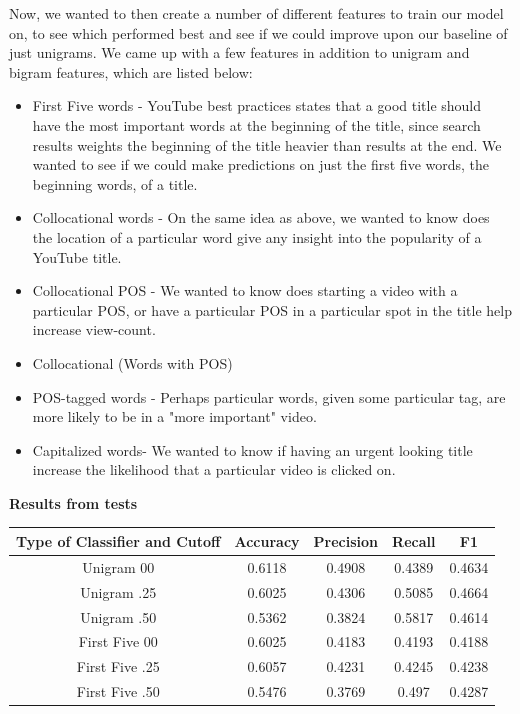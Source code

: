 \documentclass[a4paper,12pt]{article}
\begin{document}
Now, we wanted to then create a number of different features to train our model on, to see which performed best and see if we could improve upon our baseline of just unigrams. We came up with a few features in addition to unigram and bigram features, which are listed below: 
\begin{itemize}
    \item First Five words - YouTube best practices states that a good title should have the most important words at the beginning of the title, since search results weights the beginning of the title heavier than results at the end. We wanted to see if we could make predictions on just the first five words, the beginning words, of a title.
  \item Collocational words - On the same idea as above, we wanted to know does the location of a particular word give any insight into the popularity of a YouTube title.
  \item Collocational POS - We wanted to know does starting a video with a particular POS, or have a particular POS in a particular spot in the title help increase view-count.
  \item Collocational (Words with POS)
  \item POS-tagged words - Perhaps particular words, given some particular tag, are more likely to be in a "more important" video.
  \item Capitalized words- We wanted to know if having an urgent looking title increase the likelihood that a particular video is clicked on.
\end{itemize}

\textbf{Results from tests}\\

\begin{center}
 \begin{tabular}{|c| c| c| c| c|} 
 \hline
 Type of Classifier and Cutoff & Accuracy & Precision & Recall & F1 \\ [0.5ex] 
\hline
 Unigram 00 & 0.6118  & 0.4908  &0.4389  & 0.4634\\ 
 \hline
 {Unigram .25} &  0.6025& 0.4306  & 0.5085  & {0.4664}\\ 
\hline
 Unigram .50 & 0.5362  & 0.3824  & 0.5817  & 0.4614\\ 
\hline
  \hline

 \hline
 First Five 00 & 0.6025  & 0.4183  &0.4193  & 0.4188\\ 
 \hline
 {First Five .25} &  0.6057& 0.4231  & 0.4245  & {0.4238}\\ 
\hline
 First Five .50 & 0.5476  & 0.3769  & 0.497  & 0.4287\\ 
 \hline
\end{tabular}
\end{center}
\end{document}

